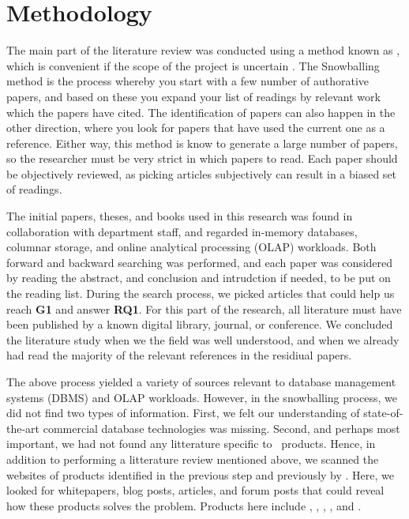 \section{Methodology}
\label{sec:Methodology}
The main part of the literature review was conducted using a method known as , which is convenient if the scope of the project is uncertain \cite{Ang2014-nm}. The Snowballing method is the process whereby you start with a few number of authorative papers, and based on these you expand your list of readings by relevant work which the papers have cited. The identification of papers can also happen in the other direction, where you look for papers that have used the current one as a reference. Either way, this method is know to generate a large number of papers, so the researcher must be very strict in which papers to read. Each paper should be objectively reviewed, as picking articles subjectively can result in a biased set of readings.

The initial papers, theses, and books used in this research was found in collaboration with department staff, and regarded in-memory databases, columnar storage, and online analytical processing (OLAP) workloads. Both forward and backward searching was performed, and each paper was considered by reading the abstract, and conclusion and intrudction if needed, to be put on the reading list. During the search process, we picked articles that could help us reach \textbf{G1} and answer \textbf{RQ1}. For this part of the research, all literature must have been published by a known digital library, journal, or conference. We concluded the literature study when we the field was well understood, and when we already had read the majority of the relevant references in the residiual papers.

The above process yielded a variety of sources relevant to database management systems (DBMS) and OLAP workloads. However, in the snowballing process, we did not find two types of information. First, we felt our understanding of state-of-the-art commercial database technologies was missing. Second, and perhaps most important, we had not found any litterature specific to \bd~products. Hence, in addition to performing a  litterature review mentioned above, we scanned the websites of products identified in the previous step and previously by \genus. Here, we looked for whitepapers, blog posts, articles, and forum posts that could reveal how these products solves the problem. Products here include , , , , and .
